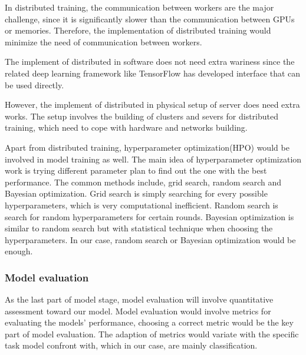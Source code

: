                     In distributed training, the communication between workers are the major challenge, since it is significantly slower than the communication between GPUs or memories. Therefore, the implementation of distributed training would minimize the need of communication between workers.

                    The implement of distributed in software does not need extra wariness since the related deep learning framework like TensorFlow has developed interface that can be used directly.

                    However, the implement of distributed in physical setup of server does need extra works. The setup involves the building of clusters and severs for distributed training, which need to cope with hardware and networks building.

                    Apart from distributed training, hyperparameter optimization(HPO) would be involved in model training as well. The main idea of hyperparameter optimization work is trying different parameter plan to find out the one with the best performance. The common methods include, grid search, random search and Bayesian optimization. Grid search is simply searching for every possible hyperparameters, which is very computational inefficient. Random search is search for random hyperparameters for certain rounds. Bayesian optimization is similar to random search but with statistical technique when choosing the hyperparameters. In our case, random search or Bayesian optimization would be enough.
            \subsubsection{Model evaluation}
                    As the last part of model stage, model evaluation will involve quantitative assessment toward our model. Model evaluation would involve metrics for evaluating the models' performance, choosing a correct metric would be the key part of model evaluation. The adaption of metrics would variate with the specific task model confront with, which in our case, are mainly classification.

